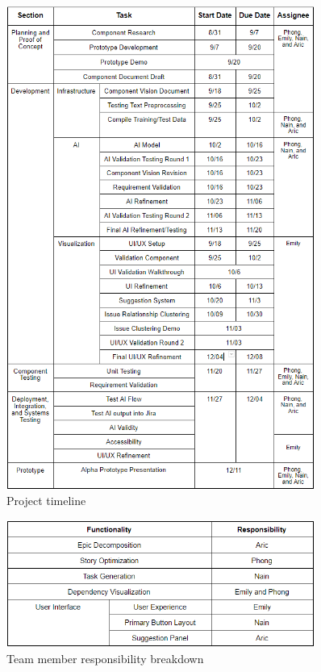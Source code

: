 \begin{figure}
\centering
\includegraphics[width=0.9\textwidth,keepaspectratio]{./figure/ProjectTimeline.png}
\caption{Project timeline}
\label{fig:timeline}
\end{figure}

\begin{figure}
\centering
\includegraphics[width=0.9\textwidth,keepaspectratio]{./figure/FunctionResponsibility.png}
\caption{Team member responsibility breakdown}
\label{fig:responsibility}
\end{figure}